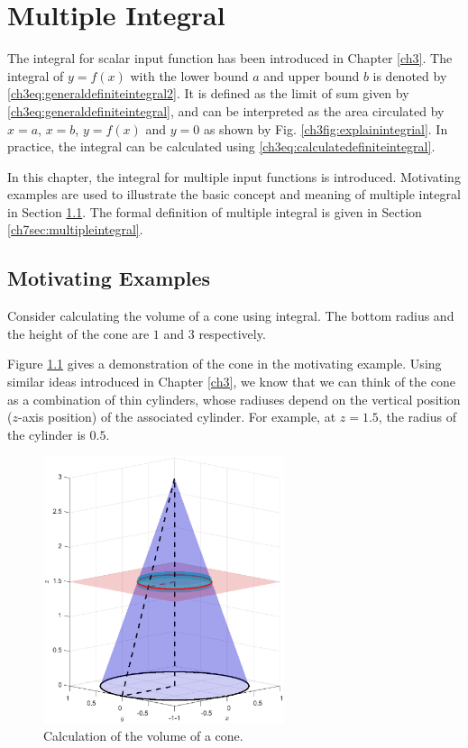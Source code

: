 \chapter{Multiple Integral} \label{ch7ch}

The integral for scalar input function has been introduced in Chapter \ref{ch3}. The integral of $y=f(x)$ with the lower bound $a$ and upper bound $b$ is denoted by \eqref{ch3eq:generaldefiniteintegral2}. It is defined as the limit of sum given by \eqref{ch3eq:generaldefiniteintegral}, and can be interpreted as the area circulated by $x=a$, $x=b$, $y=f(x)$ and $y=0$ as shown by Fig. \ref{ch3fig:explainintegrial}. In practice, the integral can be calculated using \eqref{ch3eq:calculatedefiniteintegral}.

In this chapter, the integral for multiple input functions is introduced. Motivating examples are used to illustrate the basic concept and meaning of multiple integral in Section \ref{ch7sec:motivatingexp}. The formal definition of multiple integral is given in Section \ref{ch7sec:multipleintegral}.

\section{Motivating Examples} \label{ch7sec:motivatingexp}

\begin{shortbox}

Consider calculating the volume of a cone using integral. The bottom radius and the height of the cone are $1$ and $3$ respectively.

\end{shortbox}

Figure \ref{ch7fig:motivatingexp1} gives a demonstration of the cone in the motivating example. Using similar ideas introduced in Chapter \ref{ch3}, we know that we can think of the cone as a combination of thin cylinders, whose radiuses depend on the vertical position ($z$-axis position) of the associated cylinder. For example, at $z=1.5$, the radius of the cylinder is $0.5$.

\begin{figure}
	\centering
	\includegraphics[width=200pt]{chapters/part-2/figures/motivatingexp1.eps}
	\caption{Calculation of the volume of a cone.} \label{ch7fig:motivatingexp1}
\end{figure}

